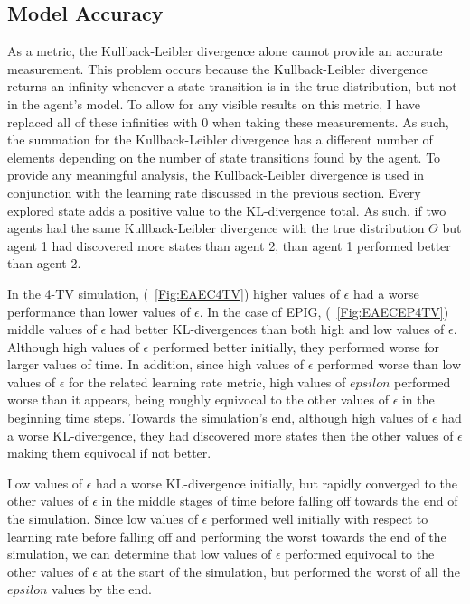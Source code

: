 \documentclass[12pt]{thesis}
\begin{document}
\subsection{Model Accuracy}
As a metric, the Kullback-Leibler divergence alone cannot provide an accurate measurement. This problem occurs because the Kullback-Leibler divergence returns an infinity whenever a state transition is in the true distribution, but not in the agent's model. To allow for any visible results on this metric, I have replaced all of these infinities with 0 when taking these measurements. As such, the summation for the Kullback-Leibler divergence has a different number of elements depending on the number of state transitions found by the agent. To provide any meaningful analysis, the Kullback-Leibler divergence is used in conjunction with the learning rate discussed in the previous section. Every explored state adds a positive value to the KL-divergence total. As such, if two agents had the same Kullback-Leibler divergence with the true distribution $\Theta$ but agent 1 had discovered more states than agent 2, than agent 1 performed better than agent 2.

In the 4-TV simulation, (\figurename~\ref{Fig:EAEC4TV}) higher values of $\epsilon$ had a worse performance than lower values of $\epsilon$. In the case of EPIG, (\figurename~\ref{Fig:EAECEP4TV}) middle values of $\epsilon$ had better KL-divergences than both high and low values of $\epsilon$. Although high values of $\epsilon$ performed better initially, they performed worse for larger values of time. In addition, since high values of $\epsilon$ performed worse than low values of $\epsilon$ for the related learning rate metric, high values of $epsilon$ performed worse than it appears, being roughly equivocal to the other values of $\epsilon$ in the beginning time steps. Towards the simulation's end, although high values of $\epsilon$ had a worse KL-divergence, they had discovered more states then the other values of $\epsilon$ making them equivocal if not better. 

Low values of $\epsilon$ had a worse KL-divergence initially, but rapidly converged to the other values of $\epsilon$ in the middle stages of time before falling off towards the end of the simulation. Since low values of $\epsilon$ performed well initially with respect to learning rate before falling off and performing the worst towards the end of the simulation, we can determine that low values of $\epsilon$ performed equivocal to the other values of $\epsilon$ at the start of the simulation, but performed the worst of all the $epsilon$ values by the end.
\end{document}
